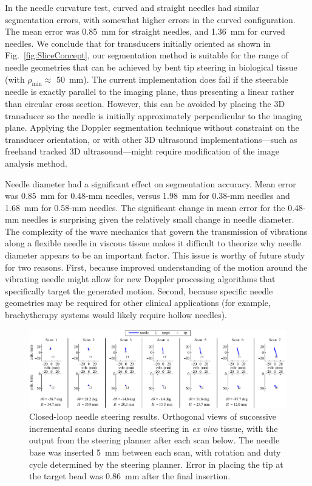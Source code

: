 In the needle curvature test, curved and straight needles had similar segmentation errors, with somewhat higher errors in the curved configuration. The mean error was 0.85~mm for straight needles, and 1.36~mm for curved needles. We conclude that for transducers initially oriented as shown in Fig.~\ref{fig:SliceConcept}, our segmentation method is suitable for the range of needle geometries that can be achieved by bent tip steering in biological tissue (with $\rho_{\text{min}} \approx$ 50~mm). The current implementation does fail if the steerable needle is exactly parallel to the imaging plane, thus presenting a linear rather than circular cross section. However, this can be avoided by placing the 3D transducer so the needle is initially approximately perpendicular to the imaging plane. Applying the Doppler segmentation technique without constraint on the transducer orientation, or with other 3D ultrasound implementations---such as freehand tracked 3D ultrasound---might require modification of the image analysis method.

Needle diameter had a significant effect on segmentation accuracy. Mean error was 0.85~mm for 0.48-mm needles, versus 1.98~mm for 0.38-mm needles and 1.68~mm for 0.58-mm needles. The significant change in mean error for the 0.48-mm needles is surprising given the relatively small change in needle diameter. The complexity of the wave mechanics that govern the transmission of vibrations along a flexible needle in viscous tissue makes it difficult to theorize why needle diameter appears to be an important factor. This issue is worthy of future study for two reasons. First, because improved understanding of the motion around the vibrating needle might allow for new Doppler processing algorithms that specifically target the generated motion. Second, because specific needle geometries may be required for other clinical applications (for example, brachytherapy systems would likely require hollow needles).

\begin{figure}[!ht]
\centering
\includegraphics[width = \textwidth]{Images/Chapter2/Steering/Steering}%
\caption{Closed-loop needle steering results. Orthogonal views of successive incremental scans during needle steering in \textit{ex vivo} tissue, with the output from the steering planner after each scan below. The needle base was inserted 5~mm between each scan, with rotation and duty cycle determined by the steering planner. Error in placing the tip at the target bead was 0.86~mm after the final insertion.}
\label{fig:SucessfulSteering}
\end{figure}

